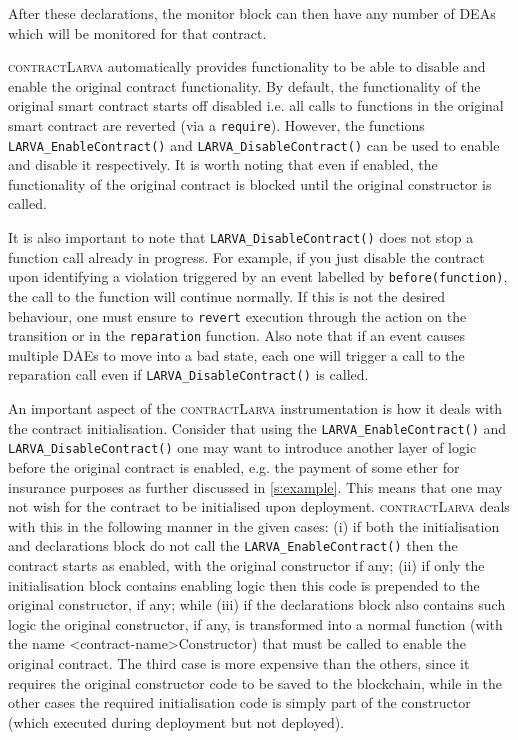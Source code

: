 \documentclass{article}
\newcommand{\contractlarva}{\textsc{contractLarva}\xspace}
\begin{document}
  After these declarations, the monitor block can then have any number of DEAs which will be monitored for that contract. 
 
 \contractlarva automatically provides functionality to be able to disable and enable the original contract functionality. By default, the functionality of the original smart contract starts off disabled i.e. all calls to functions in the original smart contract are reverted (via a \texttt{require}). However, the functions \texttt{LARVA\_EnableContract()} and \texttt{LARVA\_DisableContract()} can be used to enable and disable it respectively. It is worth noting that even if enabled, the functionality of the original contract is blocked until the original constructor is called.

  It is also important to note that \texttt{LARVA\_DisableContract()} does not stop a function call already in progress. For example, if you just disable the contract upon identifying a violation triggered by an event labelled by \texttt{before(function)}, the call to the function will continue normally. If this is not the desired behaviour, one must ensure to \texttt{revert} execution through the action on the transition or in the \texttt{reparation} function. Also note that if an event causes multiple DAEs to move into a bad state, each one will trigger a call to the reparation call even if \texttt{LARVA\_DisableContract()} is called.
  
  An important aspect of the \contractlarva instrumentation is how it deals with the contract initialisation. Consider that using the \texttt{LARVA\_EnableContract()} and \texttt{LARVA\_DisableContract()} one may want to introduce another layer of logic before the original contract is enabled, e.g. the payment of some ether for insurance purposes as further discussed in \ref{s:example}. This means that one may not wish for the contract to be initialised upon deployment. \contractlarva deals with this in the following manner in the given cases: (i) if both the initialisation and declarations block do not call the \texttt{LARVA\_EnableContract()} then the contract starts as enabled, with the original constructor if any; (ii) if only the initialisation block contains enabling logic then this code is prepended to the original constructor, if any; while (iii) if the declarations block also contains such logic the original constructor, if any, is transformed into a normal function (with the name <contract-name>Constructor) that must be called to enable the original contract. The third case is more expensive than the others, since it requires the original constructor code to be saved to the blockchain, while in the other cases the required initialisation code is simply part of the constructor (which executed during deployment but not deployed).
\end{document}
